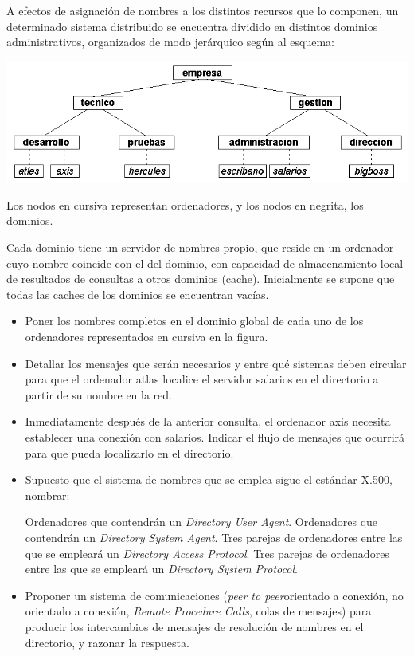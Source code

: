   \begin{problem}[12] A efectos de asignación de nombres a los distintos recursos
  que lo componen, un determinado sistema distribuido se encuentra dividido
  en distintos dominios administrativos, organizados de modo jerárquico
  según al esquema: 

  \begin{center}
  \includegraphics[width=1\textwidth]{img/si2-t4-ej-dom1.png}
  \label{Subnormalidad.}
  \end{center}

  Los nodos en cursiva representan ordenadores, y los nodos en negrita, los dominios.
  

  Cada dominio tiene un servidor de nombres propio, que reside en un ordenador
    cuyo nombre coincide con el del dominio, con capacidad de almacenamiento local
    de resultados de consultas a otros dominios (cache). Inicialmente se supone que
    todas las caches de los dominios se encuentran vacías.
  \begin{itemize}
    \item Poner los nombres completos en el dominio global de cada uno de los
      ordenadores representados en cursiva en la figura.
    \item Detallar los mensajes que serán necesarios y entre qué sistemas deben
        circular para que el ordenador atlas localice el servidor salarios en el
        directorio a partir de su nombre en la red.
      \item Inmediatamente después de la anterior consulta, el ordenador axis necesita
          establecer una conexión con salarios. Indicar el flujo de mensajes que ocurrirá
        para que pueda localizarlo en el directorio.
      \item Supuesto que el sistema de nombres que se emplea sigue el estándar X.500,
            nombrar:
            
              \subitem Ordenadores que contendrán un \textit{Directory User Agent}.
              \subitem Ordenadores que contendrán un \textit{Directory System Agent}.
              \subitem Tres parejas de ordenadores entre las que se empleará un \textit{Directory Access Protocol}.
              \subitem Tres parejas de ordenadores entre las que se empleará un \textit{Directory System Protocol}.
      \item Proponer un sistema de comunicaciones (\textit{peer to peer}orientado a conexión, no orientado a conexión, \textit{Remote Procedure Calls},
 colas de mensajes) para producir los intercambios de mensajes de 
resolución de nombres en el directorio, y razonar la respuesta.


\end{itemize}
\end{problem}

